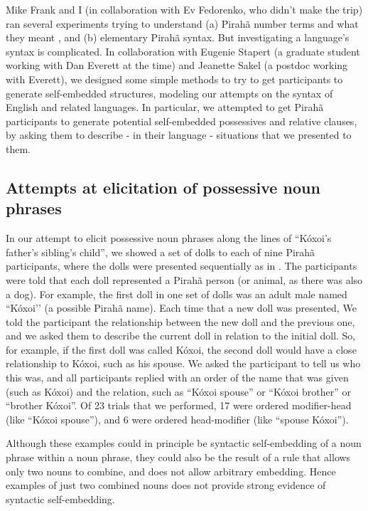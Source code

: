 \documentclass{article}
\begin{document}
Mike Frank and I (in collaboration with Ev Fedorenko, who didn’t make the trip) ran several experiments trying to understand (a) Pirahã number terms and what they meant \citep{frank2008language}, and (b) elementary Pirahã syntax. But investigating a language’s syntax is complicated.  In collaboration with Eugenie Stapert (a graduate student working with Dan Everett at the time) and Jeanette Sakel (a postdoc working with Everett), we designed some simple methods to try to get participants to generate self-embedded structures, modeling our attempts on the syntax of English and related languages. In particular, we attempted to get Pirahã participants to generate potential self-embedded possessives and relative clauses, by asking them to describe - in their language - situations that we presented to them.

\subsection{Attempts at elicitation of possessive noun phrases}

In our attempt to elicit possessive noun phrases along the lines of ``Kóxoi’s father’s sibling’s child'', we showed a set of dolls to each of nine Pirahã participants, where the dolls were presented sequentially as in . The participants were told that each doll represented a Pirahã person (or animal, as there was also a dog). For example, the first doll in one set of dolls was an adult male named ``Kóxoi’' (a possible Pirahã name). Each time that a new doll was presented, We told the participant the relationship between the new doll and the previous one, and we asked them to describe the current doll in relation to the initial doll.  So, for example, if the first doll was called Kóxoi, the second doll would have a close relationship to Kóxoi, such as his spouse. We asked the participant to tell us who this was, and all participants  replied with an order of the name that was given (such as Kóxoi) and the relation, such as ``Kóxoi spouse'' or ``Kóxoi brother'' or ``brother Kóxoi''. Of 23 trials that we performed, 17 were ordered modifier-head (like ``Kóxoi spouse''), and 6 were ordered head-modifier (like ``spouse Kóxoi'').

Although these examples could in principle be syntactic self-embedding of a noun phrase within a noun phrase, they could also be the result of a rule that allows only two nouns to combine, and does not allow arbitrary embedding.  Hence examples of just two combined nouns does not provide strong evidence of syntactic self-embedding.
\end{document}
